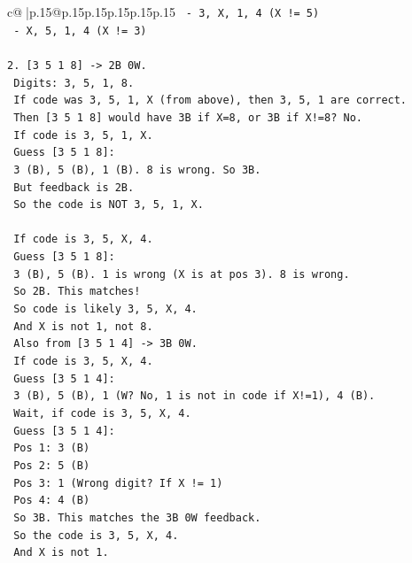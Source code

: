 \documentclass{article}
\begin{document}
{\begin{supertabular}{c@{$\;$}|p{.15\linewidth}@{}p{.15\linewidth}p{.15\linewidth}p{.15\linewidth}p{.15\linewidth}p{.15\linewidth}}
{{{\texttt{   {-} 3, X, 1, 4 (X != 5)} \\
\texttt{   {-} X, 5, 1, 4 (X != 3)} \\
\\ 
\texttt{2. {[}3 5 1 8{]} {-}> 2B 0W.} \\
\texttt{   Digits: 3, 5, 1, 8.} \\
\texttt{   If code was 3, 5, 1, X (from above), then 3, 5, 1 are correct.} \\
\texttt{   Then {[}3 5 1 8{]} would have 3B if X=8, or 3B if X!=8? No.} \\
\texttt{   If code is 3, 5, 1, X.} \\
\texttt{   Guess {[}3 5 1 8{]}:} \\
\texttt{   3 (B), 5 (B), 1 (B). 8 is wrong. So 3B.} \\
\texttt{   But feedback is 2B.} \\
\texttt{   So the code is NOT 3, 5, 1, X.} \\
\\ 
\texttt{   If code is 3, 5, X, 4.} \\
\texttt{   Guess {[}3 5 1 8{]}:} \\
\texttt{   3 (B), 5 (B). 1 is wrong (X is at pos 3). 8 is wrong.} \\
\texttt{   So 2B. This matches!} \\
\texttt{   So code is likely 3, 5, X, 4.} \\
\texttt{   And X is not 1, not 8.} \\
\texttt{   Also from {[}3 5 1 4{]} {-}> 3B 0W.} \\
\texttt{   If code is 3, 5, X, 4.} \\
\texttt{   Guess {[}3 5 1 4{]}:} \\
\texttt{   3 (B), 5 (B), 1 (W? No, 1 is not in code if X!=1), 4 (B).} \\
\texttt{   Wait, if code is 3, 5, X, 4.} \\
\texttt{   Guess {[}3 5 1 4{]}:} \\
\texttt{   Pos 1: 3 (B)} \\
\texttt{   Pos 2: 5 (B)} \\
\texttt{   Pos 3: 1 (Wrong digit? If X != 1)} \\
\texttt{   Pos 4: 4 (B)} \\
\texttt{   So 3B. This matches the 3B 0W feedback.} \\
\texttt{   So the code is 3, 5, X, 4.} \\
\texttt{   And X is not 1.} \\
}}}
\end{supertabular}}
\end{document}
